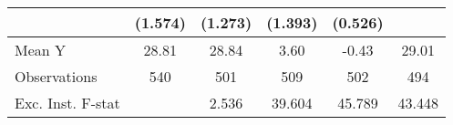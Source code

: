 {\begin{tabular}{l*{5}{c}}
            &     (1.574)         &     (1.273)         &     (1.393)         &     (0.526)         &                     \\
\midrule
Mean Y      &       28.81         &       28.84         &        3.60         &       -0.43         &       29.01         \\
Observations&         540         &         501         &         509         &         502         &         494         \\
Exc. Inst. F-stat&                     &       2.536         &      39.604         &      45.789         &      43.448         \\
\bottomrule
\end{tabular}
}
